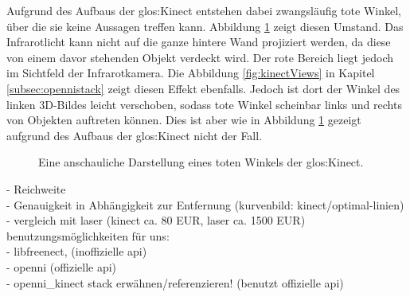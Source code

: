 Aufgrund des Aufbaus der \gls{glos:Kinect} entstehen dabei zwangsläufig tote Winkel, über die sie keine Aussagen treffen kann. Abbildung \ref{fig:toterWinkel} zeigt diesen Umstand. Das Infrarotlicht kann nicht auf die ganze hintere Wand projiziert werden, da diese von einem davor stehenden Objekt verdeckt wird. Der {\color{red}rote} Bereich liegt jedoch im Sichtfeld der Infrarotkamera. Die Abbildung \ref{fig:kinectViews} in Kapitel \ref{subsec:opennistack} zeigt diesen Effekt ebenfalls. Jedoch ist dort der Winkel des linken 3D-Bildes leicht verschoben, sodass tote Winkel scheinbar links und rechts von Objekten auftreten können. Dies ist aber wie in Abbildung \ref{fig:toterWinkel} gezeigt aufgrund des Aufbaus der \gls{glos:Kinect} nicht der Fall.
\begin{figure}[t]
	\centering
	\caption[Toter Winkel der Kinect]{Eine anschauliche Darstellung eines toten Winkels der \gls{glos:Kinect}.}
	\label{fig:toterWinkel}
\end{figure}

{\color{red}- Reichweite}\\
{\color{red}- Genauigkeit in Abhängigkeit zur Entfernung (kurvenbild: kinect/optimal-linien)}\\
{\color{red}- vergleich mit laser (kinect ca. 80 EUR, laser ca. 1500 EUR)}\\

{\color{red}
benutzungsmöglichkeiten für uns:\\
- libfreenect, (inoffizielle api)\\
- openni (offizielle api)\\
- openni\_kinect stack erwähnen/referenzieren! (benutzt offizielle api)\\
}

